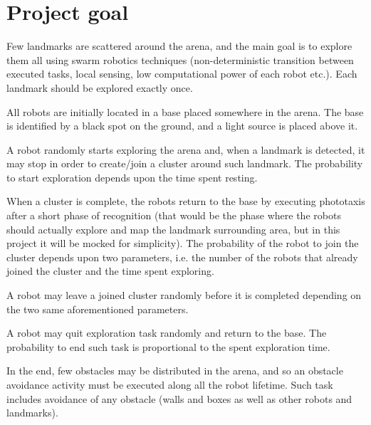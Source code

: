 \chapter{Project goal}

Few landmarks are scattered around the arena, and the main goal is to explore them all using swarm robotics techniques (non-deterministic transition between executed tasks, local sensing, low computational power of each robot etc.). Each landmark should be explored exactly once.

\noindent
All robots are initially located in a base placed somewhere in the arena. The base is identified by a black spot on the ground, and a light source is placed above it.

\noindent
A robot randomly starts exploring the arena and, when a landmark is detected, it may stop in order to create/join a cluster around such landmark. The probability to start exploration depends upon the time spent resting. 

\noindent
When a cluster is complete, the robots return to the base by executing phototaxis after a short phase of recognition (that would be the phase where the robots should actually explore and map the landmark surrounding area, but in this project it will be mocked for simplicity). The probability of the robot to join the cluster depends upon two parameters, i.e. the number of the robots that already joined the cluster and  the time spent exploring.

\noindent
A robot may leave a joined cluster randomly before it is completed depending on the two same aforementioned parameters.



\noindent
A robot may quit exploration task randomly and return to the base. The probability to end such task is proportional to the spent exploration time. 

\noindent
In the end, few obstacles may be distributed in the arena, and so an obstacle avoidance activity must be executed along all the robot lifetime. Such task includes avoidance of any obstacle (walls and boxes as well as other robots and landmarks).        